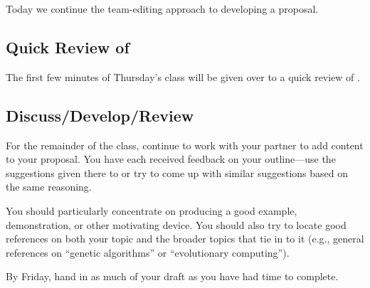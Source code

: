 
\usepackage{ulem}
\usepackage[compact]{titlesec}




Today we continue the team-editing approach to developing a proposal.

\subsection*{Quick Review of \BibTeX}
The first few minutes of Thursday's class will be given over to a quick review
of \BibTeX.

\subsection*{Discuss/Develop/Review}
For the remainder of the class, continue to work with your partner to add
content to your proposal. You have each received feedback on your 
outline---use the suggestions given there to or try to come up with similar
suggestions based on the same reasoning.

You should particularly concentrate on producing a good 
example, demonstration, or other motivating device. You should also 
try to locate good references on both your topic and the broader
topics that tie in to it (e.g., general references on ``genetic algorithms''
or ``evolutionary computing'').

 By Friday, hand in as much of your draft 
as you have had time to complete.



